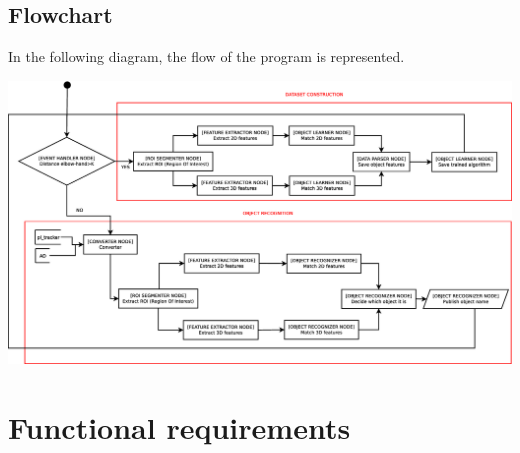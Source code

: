 \documentclass{article}
\begin{document}
\subsection{Flowchart}
In the following diagram, the flow of the program is represented. 
\begin{center}
\includegraphics[scale=0.25]{../diagrams/images/flowcharts.eps}
\end{center}





\section{Functional requirements}
\end{document}
